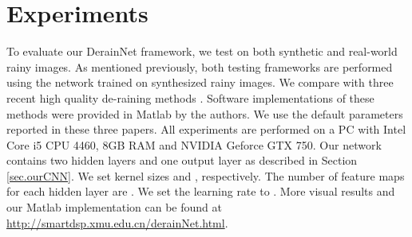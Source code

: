\documentclass[journal]{IEEEtran}
\begin{document}
\section{Experiments}
To evaluate our DerainNet framework, we test on both synthetic and real-world rainy images. As mentioned previously, both testing frameworks are performed using the network trained on synthesized rainy images. We compare with three recent high quality de-raining methods \cite{13,16,34}. Software implementations of these methods were provided in Matlab by the authors. We use the default parameters reported in these three papers. All experiments are performed on a PC with Intel Core i5 CPU 4460, 8GB RAM and NVIDIA Geforce GTX 750. Our network contains two hidden layers and one output layer as described in Section \ref{sec.ourCNN}. We set kernel sizes  and , respectively. The number of feature maps for each hidden layer are . We set the learning rate to . More visual results and our Matlab implementation can be found at \url{http://smartdsp.xmu.edu.cn/derainNet.html}.
\end{document}

